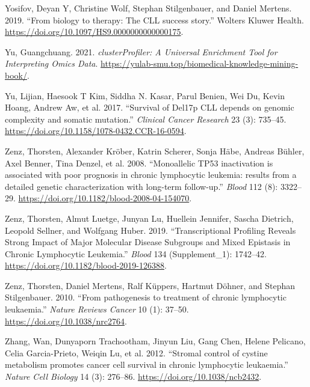 \documentclass[11pt, a4paper, twosided]{book}
\newenvironment{CSLReferences}%
  {}%
  {\par}
\begin{document}
\begin{CSLReferences}{1}{0}
\leavevmode{}%
Yosifov, Deyan Y, Christine Wolf, Stephan Stilgenbauer, and Daniel Mertens. 2019. {``{From biology to therapy: The CLL success story}.''} Wolters Kluwer Health. \url{https://doi.org/10.1097/HS9.0000000000000175}.

\leavevmode{}%
Yu, Guangchuang. 2021. \emph{clusterProfiler: A Universal Enrichment Tool for Interpreting Omics Data}. \url{https://yulab-smu.top/biomedical-knowledge-mining-book/}.

\leavevmode{}%
Yu, Lijian, Haesook T Kim, Siddha N. Kasar, Parul Benien, Wei Du, Kevin Hoang, Andrew Aw, et al. 2017. {``{Survival of Del17p CLL depends on genomic complexity and somatic mutation}.''} \emph{Clinical Cancer Research} 23 (3): 735--45. \url{https://doi.org/10.1158/1078-0432.CCR-16-0594}.

\leavevmode{}%
Zenz, Thorsten, Alexander Kröber, Katrin Scherer, Sonja Häbe, Andreas Bühler, Axel Benner, Tina Denzel, et al. 2008. {``{Monoallelic TP53 inactivation is associated with poor prognosis in chronic lymphocytic leukemia: results from a detailed genetic characterization with long-term follow-up.}''} \emph{Blood} 112 (8): 3322--29. \url{https://doi.org/10.1182/blood-2008-04-154070}.

\leavevmode{}%
Zenz, Thorsten, Almut Luetge, Junyan Lu, Huellein Jennifer, Sascha Dietrich, Leopold Sellner, and Wolfgang Huber. 2019. {``{Transcriptional Profiling Reveals Strong Impact of Major Molecular Disease Subgroups and Mixed Epistasis in Chronic Lymphocytic Leukemia}.''} \emph{Blood} 134 (Supplement\_1): 1742--42. \url{https://doi.org/10.1182/blood-2019-126388}.

\leavevmode{}%
Zenz, Thorsten, Daniel Mertens, Ralf Küppers, Hartmut Döhner, and Stephan Stilgenbauer. 2010. {``{From pathogenesis to treatment of chronic lymphocytic leukaemia}.''} \emph{Nature Reviews Cancer} 10 (1): 37--50. \url{https://doi.org/10.1038/nrc2764}.

\leavevmode{}%
Zhang, Wan, Dunyaporn Trachootham, Jinyun Liu, Gang Chen, Helene Pelicano, Celia Garcia-Prieto, Weiqin Lu, et al. 2012. {``{Stromal control of cystine metabolism promotes cancer cell survival in chronic lymphocytic leukaemia}.''} \emph{Nature Cell Biology} 14 (3): 276--86. \url{https://doi.org/10.1038/ncb2432}.


\end{CSLReferences}
\end{document}

